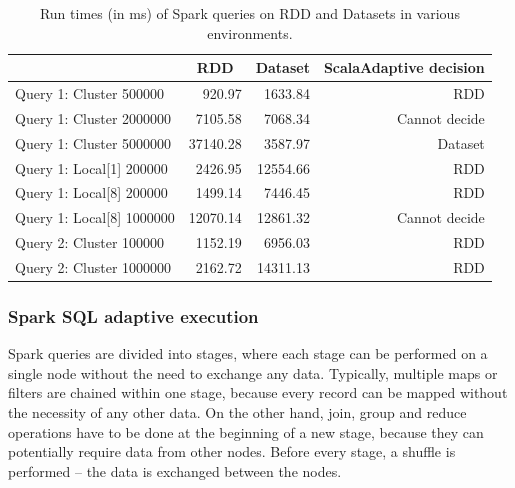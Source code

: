 \begin{table}[h!]
	\centering
	\captionsetup{justification=centering,margin=0.5cm}
	\bgroup
	\def\arraystretch{1.5}%
	\begin{tabular}{|l|r|r|r|}
		\hline
		& \multicolumn{1}{c|}{\textbf{RDD}} & \multicolumn{1}{c|}{\textbf{Dataset}} & \multicolumn{1}{c|}{\textbf{ScalaAdaptive decision}} \\ \hline
		Query 1: Cluster 500000       & 920.97                            & 1633.84                           & RDD                                                  \\ \hline
		Query 1: Cluster 2000000      & 7105.58                           & 7068.34                           & Cannot decide                                         \\ \hline
		Query 1: Cluster 5000000      & 37140.28                          & 3587.97                           & Dataset                                                  \\ \hline
		Query 1: Local{[}1{]} 200000  & 2426.95                           & 12554.66                          & RDD                                                  \\ \hline
		Query 1: Local{[}8{]} 200000  & 1499.14                           & 7446.45                           & RDD                                                  \\ \hline
		Query 1: Local{[}8{]} 1000000 & 12070.14                          & 12861.32                          & Cannot decide                                         \\ \hline
		Query 2: Cluster 100000 & 1152.19 &	6956.03 & RDD \\ \hline
		Query 2: Cluster 1000000      & 2162.72                           & 14311.13                          & RDD                                                  \\ \hline
	\end{tabular}
\egroup
\caption{Run times (in ms) of Spark queries on RDD and Datasets in various environments.}
\label{tab:spark_adaptive_rdd_vs_ds_test}
\end{table}

\subsubsection{Spark SQL adaptive execution}

Spark queries are divided into stages, where each stage can be performed on a single node without the need to exchange any data. Typically, multiple maps or filters are chained within one stage, because every record can be mapped without the necessity of any other data. On the other hand, join, group and reduce operations have to be done at the beginning of a new stage, because they can potentially require data from other nodes. Before every stage, a shuffle is performed -- the data is exchanged between the nodes. 

